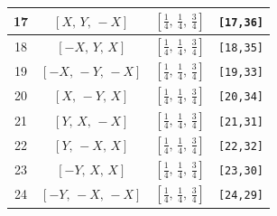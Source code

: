 \documentclass[fleqn,8pt]{jsarticle}
\begin{document}
\begin{longtable}{cccc}
17 & $\left[ X,\, Y,\, - X \right]$ & $\left[ \frac{1}{4},\, \frac{1}{4},\, \frac{3}{4} \right]$ & {\tt [17,36]} \\ \hline
18 & $\left[ - X,\, Y,\, X \right]$ & $\left[ \frac{1}{4},\, \frac{1}{4},\, \frac{3}{4} \right]$ & {\tt [18,35]} \\ \hline
19 & $\left[ - X,\, - Y,\, - X \right]$ & $\left[ \frac{1}{4},\, \frac{1}{4},\, \frac{3}{4} \right]$ & {\tt [19,33]} \\ \hline
20 & $\left[ X,\, - Y,\, X \right]$ & $\left[ \frac{1}{4},\, \frac{1}{4},\, \frac{3}{4} \right]$ & {\tt [20,34]} \\ \hline
21 & $\left[ Y,\, X,\, - X \right]$ & $\left[ \frac{1}{4},\, \frac{1}{4},\, \frac{3}{4} \right]$ & {\tt [21,31]} \\ \hline
22 & $\left[ Y,\, - X,\, X \right]$ & $\left[ \frac{1}{4},\, \frac{1}{4},\, \frac{3}{4} \right]$ & {\tt [22,32]} \\ \hline
23 & $\left[ - Y,\, X,\, X \right]$ & $\left[ \frac{1}{4},\, \frac{1}{4},\, \frac{3}{4} \right]$ & {\tt [23,30]} \\ \hline
24 & $\left[ - Y,\, - X,\, - X \right]$ & $\left[ \frac{1}{4},\, \frac{1}{4},\, \frac{3}{4} \right]$ & {\tt [24,29]} \\
\end{longtable}
\renewcommand{\arraystretch}{1.2}
\end{document}
